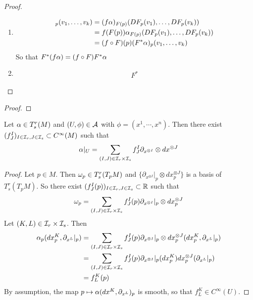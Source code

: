 \documentclass{book}
\begin{document}
	\begin{proof}\
	\begin{enumerate}
	\item 
	\begin{align*}
	[F^*(f \al)]_p(v_1, \dots, v_k) 
	& = (f \al )_{F(p)}(DF_p(v_1), \dots, DF_p(v_k)) \\
	& = f (F(p)) \al_{F(p)} (DF_p(v_1), \dots, DF_p(v_k)) \\
	& = (f \circ F)(p) (F^*\al)_p(v_1, \dots, v_k)
	\end{align*}
	So that $F^*(f \alpha) = (f \circ F) F^* \alpha$
	\item 
	\begin{align*}
		F^*
	\end{align*}
	\end{enumerate}
	
	\end{proof}
	
	
	
	
	
	\begin{defn}
	
	\end{defn}

	
	\begin{ex}
	
	\end{ex}
	
	\begin{proof}
	
	\end{proof}
	
	\begin{ex}
		Let $\alpha \in T^r_s(M)$ and $(U, \phi) \in \mathcal{A}$ with $\phi = (x^1, \cdots, x^n)$. Then there exist $(f^I_J)_{I \in \mathcal{I}_r, J \in \mathcal{I}_s} \subset C^{\infty}(M)$ such that $$\alpha|_U = \sum_{(I,J) \in \mathcal{I}_r \times \mathcal{I}_s} f^I_J \partial_{x^{\otimes I}} \otimes dx^{\otimes J}$$ 
	\end{ex}

	\begin{proof}
		Let $p \in M$. Then $\omega_p \in T^r_s(T_pM)$ and $\bigg \{\partial_{x^{\otimes I}}|_p \otimes dx^{\otimes J}_p \bigg \}$ is a basis of $T^r_s(T_pM)$. So there exist $(f^I_J(p))_{I \in \mathcal{I}_r, J \in \mathcal{I}_s } \subset \mathbb{R}$ such that $$\omega_p = \sum\limits_{(I,J) \in \mathcal{I}_r \times \mathcal{I}_s } f^I_J(p) \partial_{x^{\otimes I}}|_p \otimes dx^{\otimes J}_p $$
		Let $(K,L) \in \mathcal{I}_r \times \mathcal{I}_s$. Then 
		\begin{align*}
		\alpha_p(dx^K_p, \partial_{x^L}|_p) 
		& =  \sum\limits_{(I,J) \in \mathcal{I}_r \times \mathcal{I}_s } f^I_J(p) \partial_{x^{\otimes I}}|_p \otimes dx^{\otimes J}_p(dx^K_p, \partial_{x^L}|_p) \\
		& = \sum\limits_{(I,J) \in \mathcal{I}_r \times \mathcal{I}_s } f^I_J(p) \partial_{x^{\otimes I}}|_p (dx^K_p) dx^{\otimes J}_p(\partial_{x^L}|_p)  \\
		& = f^K_L(p)
		\end{align*}
		By assumption, the map $p \mapsto \alpha(dx^K, \partial_{x^L})_p$ is smooth, so that $f^K_L \in C^{\infty}(U)$.
	
	\end{proof}
	
\end{document}
